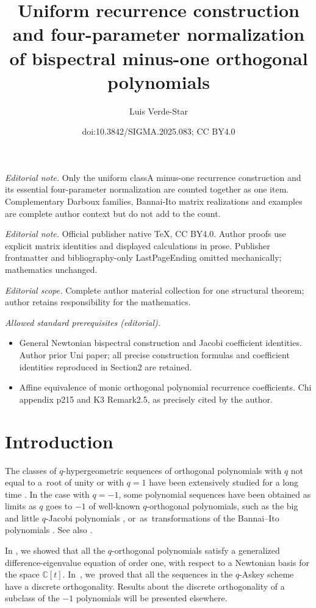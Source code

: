 \documentclass[10pt,a4paper]{amsart}
\title{Uniform recurrence construction and four-parameter normalization of bispectral minus-one orthogonal polynomials}
\author{Luis Verde-Star}
\date{doi:10.3842/SIGMA.2025.083; CC BY4.0}
\numberwithin{equation}{section}
\begin{document}
\maketitle
\noindent\textit{Editorial note.} Only the uniform classA minus-one recurrence construction and its essential four-parameter normalization are counted together as one item. Complementary Darboux families, Bannai-Ito matrix realizations and examples are complete author context but do not add to the count.\par\medskip
\noindent\textit{Editorial note.} Official publisher native TeX, CC BY4.0. Author proofs use explicit matrix identities and displayed calculations in prose. Publisher frontmatter and bibliography-only LastPageEnding omitted mechanically; mathematics unchanged.\par\medskip
\noindent\textit{Editorial scope.} Complete author material collection for one structural theorem; author retains responsibility for the mathematics.\par\medskip
\noindent\textit{Allowed standard prerequisites (editorial).}\begin{itemize}
\item General Newtonian bispectral construction and Jacobi coefficient identities. Author prior Uni paper; all precise construction formulas and coefficient identities reproduced in Section2 are retained.
\item Affine equivalence of monic orthogonal polynomial recurrence coefficients. Chi appendix p215 and K3 Remark2.5, as precisely cited by the author.
\end{itemize}\medskip
\section{Introduction}
The classes of $q$-hypergeometric sequences of orthogonal polynomials with $q$ not equal to a~root of unity or with $q=1$ have been extensively studied for a long time \cite{Hyp}. In the case with $q=-1$, some polynomial sequences have been obtained as limits as $q$ goes to $-1$ of well-known $q$-orthogonal polynomials, such as the big and little $q$-Jacobi polynomials \cite{VZ1, VZ2}, or~as~transformations of the Bannai--Ito polynomials \cite{GenVZ2, GenVZ}. See also \cite{CohlCS, Tsuji, TsujiDunkl, TsuDualHahn}.

In \cite{Uni}, we showed that all the $q$-orthogonal polynomials sat\-isfy a gen\-er\-al\-ized dif\-fer\-ence-eigenvalue equation of order one, with respect to a Newtonian basis for the space ${\mathbb C}[t]$. In~\cite{qdiscr}, we~proved that all the sequences in the $q$-Askey scheme have a discrete orthogonality. Results about the discrete orthogonality of a subclass of the $-1$ polynomials will be presented elsewhere.
\end{document}
